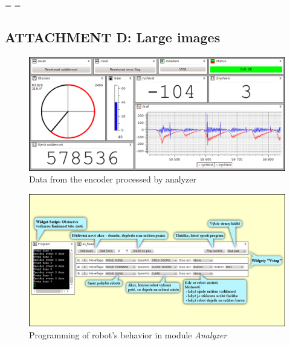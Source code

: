 \documentclass[12pt, a4paper, oneside]{article}
\newcommand{\It}{\textit}  %
\begin{document}
\newpage
\pagestyle{empty}
\textheight=\paperheight
\textwidth=\paperwidth
\voffset=-130pt
\begin{landscape}

\begin{center}
\section*{ATTACHMENT D: Large images}
\end{center}

\begin{figure}[h]
\begin{center}
\includegraphics{img/enc_full.png}
\caption{Data from the encoder processed by analyzer}
\label{analyzer_all}
\end{center}
\end{figure}

\newpage
\begin{figure}[h]
\begin{center}
\includegraphics[width=750pt]{img/control_david.png}
\caption{Programming of robot's behavior in module \It{Analyzer}}
\label{david_ctrl}
\end{center}
\end{figure}
\end{landscape}
\end{document}
